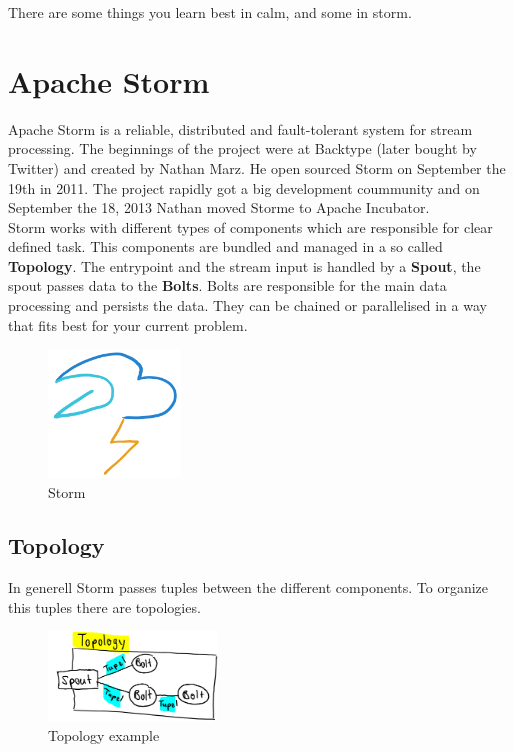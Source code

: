 \begin{savequote}[75mm]
There are some things you learn best in calm, and some in storm.
\end{savequote}

\chapter{Apache Storm}

Apache Storm is a reliable, distributed and fault-tolerant system for stream processing.
The beginnings of the project were at Backtype (later bought by Twitter) and created by Nathan Marz.
He open sourced Storm on September the 19th in 2011. The project rapidly got a big development coummunity and
on September the 18, 2013 Nathan moved Storme to Apache Incubator.\\

Storm works with different types of components which are responsible for clear defined task.
This components are bundled and managed in a so called \textbf{Topology}.
The entrypoint and the stream input is handled by a \textbf{Spout}, the spout passes data to the \textbf{Bolts}.
Bolts are responsible for the main data processing and persists the data.
They can be chained or parallelised in a way that fits best for your current problem.

\begin{figure}[hp]
\centering
\captionsetup{justification=centering}
\includegraphics[width=100pt]{images/storm.png}
\caption[Storm]{Storm}
\end{figure}

\newpage

\section{Topology}
In generell Storm passes tuples between the different components.
To organize this tuples there are topologies.
\begin{figure}[H]
\centering
\captionsetup{justification=centering}
\includegraphics[width=0.4\textwidth]{images/topology_example.png}
\caption[Topology example]{Topology example}
\end{figure}

